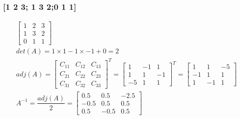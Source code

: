 \documentclass[12pt,a4paper]{article}
\begin{document}
\subsubsection{[1 2 3; 1 3 2;0 1 1]}
\begin{gather*}
\begin{bmatrix}
1&2&3\\1&3&2\\0&1&1
\end{bmatrix}\\
det(A) = 1\times 1 - 1\times -1 + 0 = 2\\
adj(A) = 
\begin{bmatrix}
C_{11}&C_{12}&C_{13}\\C_{21}&C_{22}&C_{23}\\C_{31}&C_{32}&C_{33}
\end{bmatrix}^T=
\begin{bmatrix}
1&-1&1\\1&1&-1\\-5&1&1
\end{bmatrix}^T=
\begin{bmatrix}
1&1&-5\\-1&1&1\\1&-1&1
\end{bmatrix}
\\
A^{-1}=\dfrac{adj(A)}{2}=
\begin{bmatrix}
0.5& 0.5&-2.5\\-0.5&0.5&0.5\\0.5&-0.5&0.5
\end{bmatrix}\\
\end{gather*}
\end{document}
